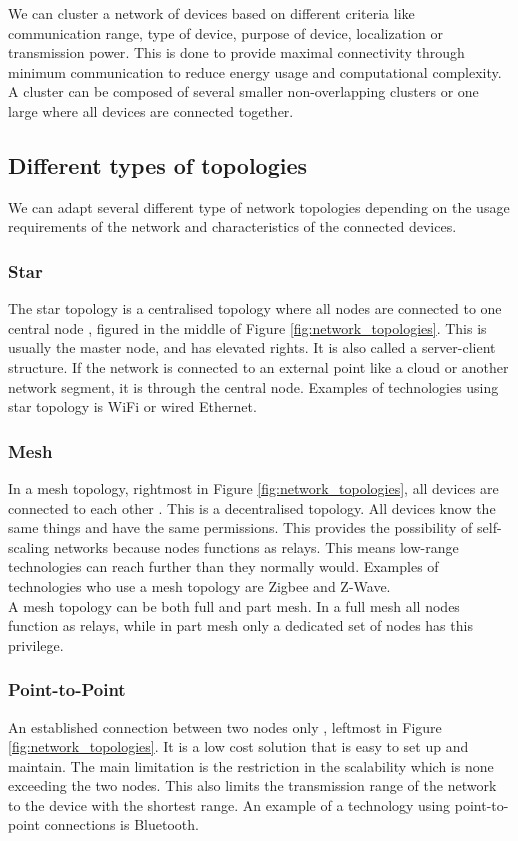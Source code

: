 We can cluster a network of devices based on different criteria like communication range, type of device, purpose of device, localization or transmission power\cite{intrusion_detection}. This is done to provide maximal connectivity through minimum communication to reduce energy usage and computational complexity. A cluster can be composed of several smaller non-overlapping clusters or one large where all devices are connected together.

\subsection{Different types of topologies}
We can adapt several different type of network topologies depending on the usage requirements of the network and characteristics of the connected devices. \\

\subsubsection{Star}
 The star topology is a centralised topology where all nodes are connected to one central node \cite{computer_networking}, figured in the middle of Figure \ref{fig:network_topologies}. This is usually the master node, and has elevated rights. It is also called a server-client structure. If the network is connected to an external point like a cloud or another network segment, it is through the central node. Examples of technologies using star topology is WiFi or wired Ethernet.  

\subsubsection{Mesh}
In a mesh topology, rightmost in Figure \ref{fig:network_topologies}, all devices are connected to each other \cite{computer_networking}. This is a decentralised topology. All devices know the same things and have the same permissions. This provides the possibility of self-scaling networks because nodes functions as relays. This means low-range technologies can reach further than they normally would. Examples of technologies who use a mesh topology are Zigbee and Z-Wave.\\

A mesh topology can be both full and part mesh. In a full mesh all nodes function as relays, while in part mesh only a dedicated set of nodes has this privilege. 

\subsubsection{Point-to-Point}
An established connection between two nodes only \cite{oreilly:IoT_topology}, leftmost in Figure \ref{fig:network_topologies}. It is a low cost solution that is easy to set up and maintain. The main limitation is the restriction in the scalability which is none exceeding the two nodes. This also limits the transmission range of the network to the device with the shortest range. An example of a technology using point-to-point connections is Bluetooth.\\

